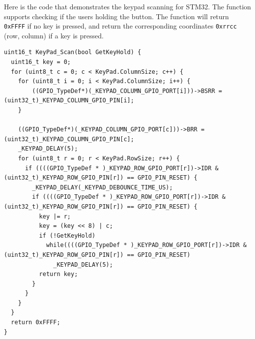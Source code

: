 \documentclass[a4paper, twoside]{report}
\begin{document}
Here is the code that demonstrates the keypad scanning for STM32. The function supports checking if the users holding the button. The function will return \texttt{0xFFFF} if no key is pressed, and return the corresponding coordinates \texttt{0xrrcc} (row, column) if a key is pressed.

\begin{verbatim}
uint16_t KeyPad_Scan(bool GetKeyHold) {
  uint16_t key = 0;
  for (uint8_t c = 0; c < KeyPad.ColumnSize; c++) {
    for (uint8_t i = 0; i < KeyPad.ColumnSize; i++) {
    	((GPIO_TypeDef*)(_KEYPAD_COLUMN_GPIO_PORT[i]))->BSRR = (uint32_t)_KEYPAD_COLUMN_GPIO_PIN[i];
    }

	((GPIO_TypeDef*)(_KEYPAD_COLUMN_GPIO_PORT[c]))->BRR = (uint32_t)_KEYPAD_COLUMN_GPIO_PIN[c];
    _KEYPAD_DELAY(5);
    for (uint8_t r = 0; r < KeyPad.RowSize; r++) {
      if ((((GPIO_TypeDef * )_KEYPAD_ROW_GPIO_PORT[r])->IDR & (uint32_t)_KEYPAD_ROW_GPIO_PIN[r]) == GPIO_PIN_RESET) {
        _KEYPAD_DELAY(_KEYPAD_DEBOUNCE_TIME_US);
        if ((((GPIO_TypeDef * )_KEYPAD_ROW_GPIO_PORT[r])->IDR & (uint32_t)_KEYPAD_ROW_GPIO_PIN[r]) == GPIO_PIN_RESET) {
          key |= r;
          key = (key << 8) | c;
          if (!GetKeyHold)
            while((((GPIO_TypeDef * )_KEYPAD_ROW_GPIO_PORT[r])->IDR & (uint32_t)_KEYPAD_ROW_GPIO_PIN[r]) == GPIO_PIN_RESET)
              _KEYPAD_DELAY(5);
          return key;
        }
      }
    }
  }
  return 0xFFFF;
}
\end{verbatim}
\end{document}
